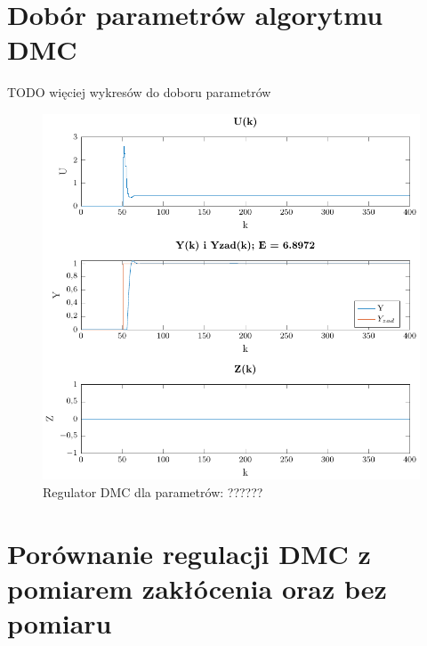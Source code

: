 \documentclass[a4paper,titlepage,11pt,twosides,floatssmall]{mwrep}
\begin{document}
\section{Dobór parametrów algorytmu DMC}

TODO więciej wykresów do doboru parametrów
\begin{figure}[H]
	\centering
	\includegraphics{../../Lab2/PDF_rysunki/Z4_DMCBezZaklocen.pdf}
	\caption{Regulator DMC dla parametrów: ??????}
	\label{dobor_param1}
\end{figure}


\section{Porównanie regulacji DMC z pomiarem zakłócenia oraz bez pomiaru}
\end{document}
